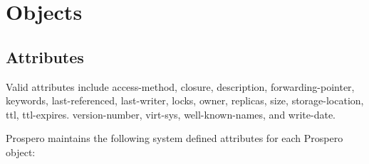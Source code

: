 \section{Objects}

\subsection{Attributes\label{access-method}}

Valid attributes include {\sc access-method,
closure, description, forwarding-pointer, keywords, last-referenced,
last-writer, locks, owner, replicas, size, storage-location, ttl,
ttl-expires.  version-number, virt-sys, well-known-names,} and {\sc
write-date}.

Prospero maintains the following system defined attributes for each
Prospero object:

